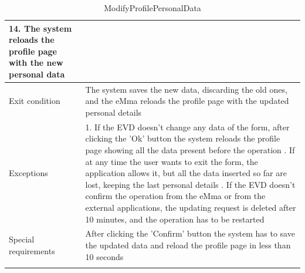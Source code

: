 \begin{center}
\begin{longtable}{p{4cm} p{11cm}}
                    14. The system reloads the profile page with the new personal data \\
     \hline
     Exit condition & The system saves the new data, discarding the old ones, and the eMma reloads the profile page with the updated personal details\\
     \hline
     Exceptions &   1. If the EVD doesn't change any data of the form, after clicking the 'Ok' button the system                        reloads the profile page showing all the data present before the operation \newline
                    2. If at any time the user wants to exit the form, the application allows it, but all the data inserted so far are lost, keeping the last personal details \newline
                    3. If the EVD doesn't confirm the operation from the eMma or from the external applications, the updating request is deleted after 10 minutes, and the operation has to be restarted 
                    \\
     \hline
     Special requirements & After clicking the 'Confirm' button the system has to save the updated data and reload the profile page in less than 10 seconds \\
     \hline
    \caption{ModifyProfilePersonalData}
    \label{tab:ModifyProfilePersonalData}
    \end{longtable}
\end{center}

